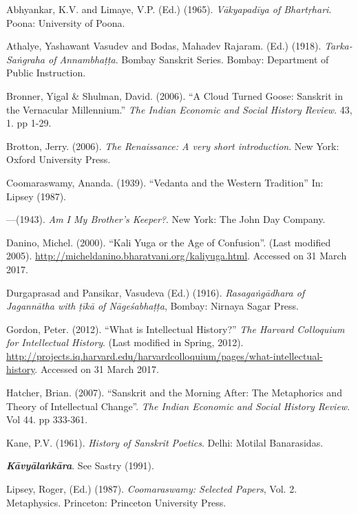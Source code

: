 \begin{thebibliography}{99}
\itemsep=1pt
Abhyankar, K.V. and Limaye, V.P. (Ed.) (1965). {\sl Vākyapadīya of Bhartṛhari}. Poona: University of Poona.

 Athalye, Yashawant Vasudev and Bodas, Mahadev Rajaram. (Ed.) (1918). {\sl Tarka-Saṅgraha of Annambhaṭṭa}. Bombay Sanskrit Series. Bombay: Department of Public Instruction. 

 Bronner, Yigal \& Shulman, David. (2006). “A Cloud Turned Goose: Sanskrit in the Vernacular Millennium.” {\sl The Indian Economic and Social History Review}. 43, 1. pp 1-29.

Brotton, Jerry. (2006). {\sl The Renaissance: A very short introduction}. New York: Oxford University Press. 

Coomaraswamy, Ananda. (1939). ``Vedanta and the Western Tradition'' In: Lipsey (1987).

---\kern3pt(1943). {\sl Am I My Brother’s Keeper?}. New York: The John Day Company. 

Danino, Michel. (2000). “Kali Yuga or the Age of Confusion”. (Last modified 2005). \url{http://micheldanino.bharatvani.org/kaliyuga.html}. Accessed on 31 March 2017.

Durgaprasad and Pansikar, Vasudeva (Ed.) (1916). {\sl Rasagaṅgādhara of Jagannātha with ṭīkā of Nāgeśabhaṭṭa}, Bombay: Nirnaya Sagar Press. 

Gordon, Peter. (2012). “What is Intellectual History?” {\sl The Harvard Colloquium for Intellectual History}. (Last modified in Spring, 2012). \url{http://projects.iq.harvard.edu/harvardcolloquium/pages/what-intellectual-history}. Accessed on 31 March 2017. 

 Hatcher, Brian. (2007). “Sanskrit and the Morning After: The Metaphorics and Theory of Intellectual Change”. {\sl The Indian Economic and Social History Review}. Vol 44. pp 333-361. 

 Kane, P.V. (1961). {\sl History of Sanskrit Poetics}.  Delhi: Motilal Banarasidas. 

{\sl\bfseries Kāvyālaṅkāra}. See Sastry (1991).

 Lipsey, Roger, (Ed.) (1987). {\sl Coomaraswamy: Selected Papers}, Vol. 2. Metaphysics. Princeton: Princeton University Press. 


\end{thebibliography}
